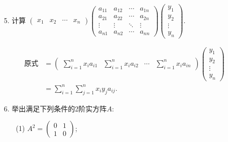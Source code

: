 \documentclass{article}
\begin{document}
\begin{enumerate}
\begin{enumerate}
\[            \]
        \end{enumerate}
        \item [5.]计算
        $\begin{pmatrix}
            x_1& x_2& \cdots & x_n
        \end{pmatrix}
        \begin{pmatrix}
            a_{11} & a_{12} & \cdots & a_{1n}\\
            a_{21} & a_{22} & \cdots & a_{2n}\\
            \vdots & \vdots & \ddots & \vdots \\
            a_{n1} & a_{n2} & \cdots & a_{nn}
        \end{pmatrix}
        \begin{pmatrix}
            y_1\\
            y_2\\
            \vdots\\
            y_n
        \end{pmatrix}.
        $

        \begin{align*}
            \mbox{原式}
            &=\left(
            \begin{array}{ccccc}
                \sum\limits_{i=1}^{n} x_{i} a_{i1} & \sum\limits_{i=1}^{n} x_{i} a_{i2} &\cdots &\sum\limits_{i=1}^{n} x_{i} a_{in}
            \end{array}
            \right)
            \begin{pmatrix}
                y_1\\
                y_2\\
                \vdots\\
                y_n
            \end{pmatrix}\\
            &=\displaystyle{\sum\limits_{i=1}^{n} \sum\limits_{j=1}^{n} x_i y_j a_{ij}}.
        \end{align*}
        \item [6.]举出满足下列条件的2阶实方阵$A$:
        \begin{enumerate}
            \item [(1)]
            $A^2=
            \begin{pmatrix}
                0 & 1\\
                1 & 0
            \end{pmatrix}$;


\end{enumerate}
\end{enumerate}
\end{document}
